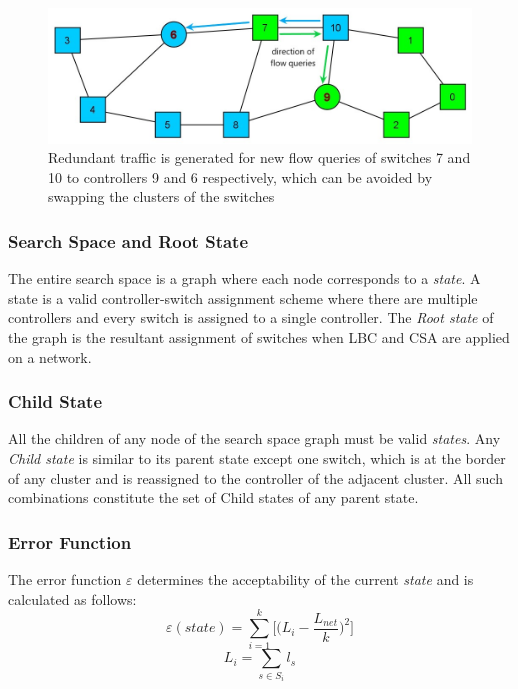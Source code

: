 \documentclass[journal]{IEEEtran}
\begin{document}
\begin{figure}
	\centering
	\includegraphics[width=\linewidth]{Images/Abilene_overlap.jpg}
	\caption{Redundant traffic is generated for new flow queries of switches 7 and 10 to controllers 9 and 6 respectively, which can be avoided by swapping the clusters of the switches} \label{fig:overlap}
\end{figure}

\subsubsection{Search Space and Root State}
The entire search space is a graph where each node corresponds to a \textit{state}. A state is a valid controller-switch assignment scheme where there are multiple controllers and every switch is assigned to a single controller. The \textit{Root state} of the graph is the resultant assignment of switches when LBC and CSA are applied on a network.

\subsubsection{Child State}
All the children of any node of the search space graph must be valid \textit{states}. Any \textit{Child state} is similar to its parent state except one switch, which is at the border of any cluster and is reassigned to the controller of the adjacent cluster. All such combinations constitute the set of Child states of any parent state.

\subsubsection{Error Function}
The error function $\varepsilon$ determines the acceptability of the current \textit{state} and is calculated as follows:
\begin{equation}
\varepsilon(state) = \sum_{i=1}^{k}\Bigg[\Big(L_i - \frac{L_{net}}{k}\Big)^2\Bigg]
\end{equation}
\begin{equation} \label{eqn:cload}
L_i = \sum_{s\in S_i}l_{s}
\end{equation}
\end{document}

